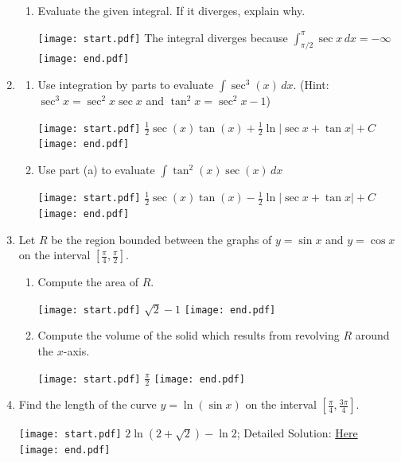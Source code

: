 \documentclass[12pt]{article}
\begin{document}
\begin{enumerate}
\begin{enumerate}
\item Evaluate the given integral.  If it diverges, explain why.

\texttt{[image: start.pdf]}
{{The integral diverges because $\int_{\pi/2}^{\pi} \sec{x} \,dx = -\infty$}}
\texttt{[image: end.pdf]}


\end{enumerate}

\item \begin{enumerate}

\item Use integration by parts to evaluate $\int \sec^{3}{(x)}\,dx$.  (Hint: $\sec^3{x}=\sec^2{x}\sec{x}$ and $\tan^2{x}=\sec^2{x}-1$)

\texttt{[image: start.pdf]}
{{$\frac{1}{2}\sec{(x)}\tan{(x)}+\frac{1}{2}\ln{|\sec{x}+\tan{x}|}+C$}}
\texttt{[image: end.pdf]}


\item Use part (a) to evaluate $\int \tan^{2}{(x)}\sec{(x)}\,dx$

\texttt{[image: start.pdf]}
{{$\frac{1}{2}\sec{(x)}\tan{(x)}-\frac{1}{2}\ln{|\sec{x}+\tan{x}|}+C$}}
\texttt{[image: end.pdf]}


\end{enumerate}

\item Let $R$ be the region bounded between the graphs of $y=\sin{x}$ and $y=\cos{x}$ on the interval $\left[\frac{\pi}{4},\frac{\pi}{2}\right]$.

\begin{enumerate}

\item Compute the area of $R$.

\texttt{[image: start.pdf]}
{{$\sqrt{2}-1$}}
\texttt{[image: end.pdf]}


\item Compute the volume of the solid which results from revolving $R$ around the $x$-axis.

\texttt{[image: start.pdf]}
{{$\frac{\pi}{2}$}}
\texttt{[image: end.pdf]}


\end{enumerate}

\item Find the length of the curve $y=\ln{(\sin{x})}$ on the interval $\left[\frac{\pi}{4},\frac{3\pi}{4}\right]$.

\texttt{[image: start.pdf]}
{{$2\ln{\left(2+\sqrt{2}\right)}-\ln{2}$; Detailed Solution: \textcolor{blue}{\href{http://www.math.drexel.edu/classes/Calculus/resources/Math122HW/Solutions/122_15_Trig_Int_27.pdf}{Here}}}}
\texttt{[image: end.pdf]}


\end{enumerate}
\end{document}
